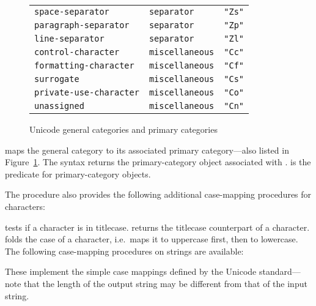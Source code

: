 \begin{figure}[tb]
\begin{tabular}{l|l|l}
   \texttt{space-separator} & \texttt{separator} & \verb|"Zs"| \\
   \texttt{paragraph-separator} & \texttt{separator} & \verb|"Zp"| \\
   \texttt{line-separator} & \texttt{separator} & \verb|"Zl"| \\[1ex]

   \texttt{control-character} & \texttt{miscellaneous} & \verb|"Cc"| \\
   \texttt{formatting-character} & \texttt{miscellaneous} & \verb|"Cf"| \\
   \texttt{surrogate} & \texttt{miscellaneous} & \verb|"Cs"| \\
   \texttt{private-use-character} & \texttt{miscellaneous} & \verb|"Co"| \\
   \texttt{unassigned} & \texttt{miscellaneous} & \verb|"Cn"|
\end{tabular}
  
  \caption{Unicode general categories and primary categories}
  \label{fig:unicode-categories}
\end{figure}

\begin{protos}
\end{protos}
%
 maps the general category to
its associated primary category---also listed in
Figure~\ref{fig:unicode-categories}.  The 
syntax returns the primary-category object associated with
.   is the
predicate for primary-category objects.

The  procedure also provides the following
additional case-mapping procedures for characters:
%
\begin{protos}
\end{protos}
%
 tests if a character is in titlecase.
 returns the titlecase counterpart of a
character.   folds the case of a character, i.e.\
maps it to uppercase first, then to lowercase.
%
The following case-mapping procedures on strings are available:
%
\begin{protos}
\end{protos}
%
These implement the simple case mappings defined by the Unicode
standard---note that the length of the output string may be different
from that of the input string.

